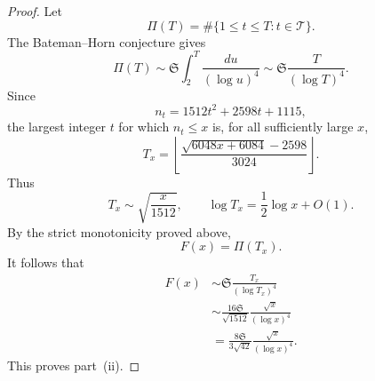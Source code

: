 \documentclass[10pt,a4paper]{amsart}
\begin{document}
\begin{proof}
Let
\[
\Pi(T)=\#\{1\le t\le T:t\in\mathcal T\}.
\]
The Bateman--Horn conjecture gives
\[
\Pi(T)
\sim
\mathfrak S\int_2^T\frac{du}{(\log u)^4}
\sim
\mathfrak S\frac{T}{(\log T)^4}.
\]
Since
\[
n_t=1512t^2+2598t+1115,
\]
the largest integer $t$ for which $n_t\le x$ is, for all sufficiently large $x$,
\[
T_x
=
\left\lfloor
\frac{\sqrt{6048x+6084}-2598}{3024}
\right\rfloor.
\]
Thus
\[
T_x\sim\sqrt{\frac{x}{1512}},
\qquad
\log T_x=\frac12\log x+O(1).
\]
By the strict monotonicity proved above,
\[
F(x)=\Pi(T_x).
\]
It follows that
\[
\begin{aligned}
F(x)
&\sim\mathfrak S\frac{T_x}{(\log T_x)^4}\\
&\sim\frac{16\mathfrak S}{\sqrt{1512}}\frac{\sqrt{x}}{(\log x)^4}\\
&=\frac{8\mathfrak S}{3\sqrt{42}}\frac{\sqrt{x}}{(\log x)^4}.
\end{aligned}
\]
This proves part~(ii).
\end{proof}
\end{document}
